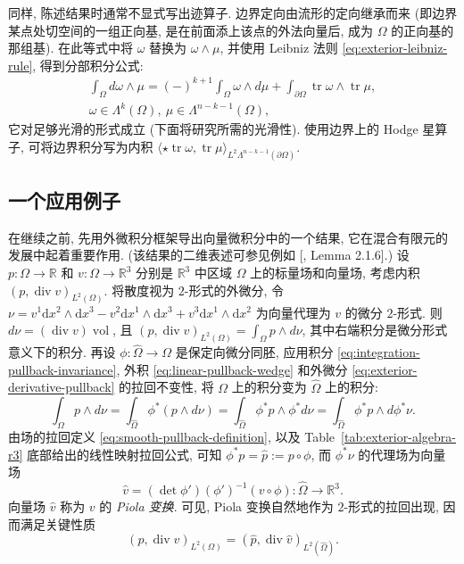 同样, 陈述结果时通常不显式写出迹算子. 边界定向由流形的定向继承而来 (即边界某点处切空间的一组正向基, 是在前面添上该点的外法向量后, 成为 $\Omega$ 的正向基的那组基).
在此等式中将 $\omega$ 替换为 $\omega\wedge\mu$, 并使用 Leibniz 法则 \eqref{eq:exterior-leibniz-rule}, 得到分部积分公式:
\begin{equation}\label{eq:differential-forms-integration-by-parts}
\begin{gathered}
\int_\Omega d\omega\wedge\mu=(-)^{k+1}\int_\Omega\omega\wedge d\mu+\int_{\partial\Omega}\operatorname{tr}\omega\wedge\operatorname{tr}\mu,\\
\omega\in\Lambda^k(\Omega),\ \mu\in\Lambda^{n-k-1}(\Omega),
\end{gathered}
\end{equation}
它对足够光滑的形式成立 (下面将研究所需的光滑性). 使用边界上的 Hodge 星算子, 可将边界积分写为内积 $\langle\star\operatorname{tr}\omega,\operatorname{tr}\mu\rangle_{L^2\Lambda^{n-k-1}(\partial\Omega)}$.

\subsection{一个应用例子}\label{subsec:piola-application}

在继续之前, 先用外微积分框架导出向量微积分中的一个结果, 它在混合有限元的发展中起着重要作用. (该结果的二维表述可参见例如 [, Lemma 2.1.6].) 设 $p:\Omega\to\mathbb R$ 和 $v:\Omega\to\mathbb R^3$ 分别是 $\mathbb R^3$ 中区域 $\Omega$ 上的标量场和向量场, 考虑内积 $(p,\operatorname{div}v)_{L^2(\Omega)}$. 将散度视为 $2$-形式的外微分, 令 $\nu=v^1\mathrm{d}x^2\wedge \mathrm{d}x^3-v^2\mathrm{d}x^1\wedge \mathrm{d}x^3+v^3\mathrm{d}x^1\wedge \mathrm{d}x^2$ 为向量代理为 $v$ 的微分 $2$-形式. 则 $d\nu=(\operatorname{div}v)\operatorname{vol}$, 且 $(p,\operatorname{div}v)_{L^2(\Omega)}=\int_\Omega p\wedge d\nu$, 其中右端积分是微分形式意义下的积分. 再设 $\phi:\widehat\Omega\to\Omega$ 是保定向微分同胚, 应用积分 \eqref{eq:integration-pullback-invariance}, 外积 \eqref{eq:linear-pullback-wedge} 和外微分 \eqref{eq:exterior-derivative-pullback} 的拉回不变性, 将 $\Omega$ 上的积分变为 $\widehat\Omega$ 上的积分:
\[
\int_\Omega p\wedge d\nu=\int_{\widehat\Omega}\phi^*(p\wedge d\nu)=\int_{\widehat\Omega}\phi^*p\wedge\phi^*d\nu=\int_{\widehat\Omega}\phi^*p\wedge d\phi^*\nu.
\]
由场的拉回定义 \eqref{eq:smooth-pullback-definition}, 以及 Table~\ref{tab:exterior-algebra-r3} 底部给出的线性映射拉回公式, 可知 $\phi^*p=\hat p:=p\circ\phi$, 而 $\phi^*\nu$ 的代理场为向量场
\[
\hat v=(\det\phi')(\phi')^{-1}(v\circ\phi):\widehat\Omega\to\mathbb R^3.
\]
向量场 $\hat v$ 称为 $v$ 的 \emph{Piola 变换}. 可见, Piola 变换自然地作为 $2$-形式的拉回出现, 因而满足关键性质
\[
(p,\operatorname{div}v)_{L^2(\Omega)}=(\hat p,\operatorname{div}\hat v)_{L^2(\widehat\Omega)}.
\]

